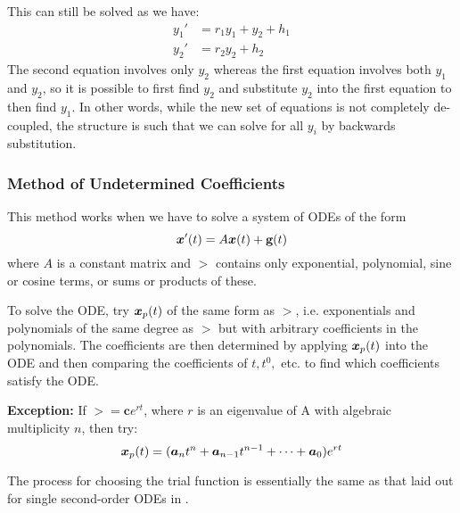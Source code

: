 This can still be solved as we have:
\begin{align*}
	y_1' &= r_1y_1 + y_2 + h_1 \\
	y_2' &= r_2y_2 + h_2
\end{align*}
The second equation involves only $y_2$ whereas the first equation involves both $y_1$ and $y_2$, so it is possible to first find $y_2$ and substitute $y_2$ into the first equation to then find $y_1$. In other words, while the new set of equations is not completely de-coupled, the structure is such that we can solve for all $y_i$ by backwards substitution.

\subsubsection{Method of Undetermined Coefficients}

This method works when we have to solve a system of ODEs of the form
\[
\bm{x}'(t) = A\bm{x}(t) + \textbf{g}(t)
\] 
where $A$ is a constant matrix and $\gt$ contains only exponential, polynomial, sine or cosine terms, or sums or products of these.

To solve the ODE, try $\bm{x}_p(t)$ of the same form as $\gt$, i.e. exponentials and polynomials of the same degree as $\gt$ but with arbitrary coefficients in the polynomials. The coefficients are then determined by applying $\bm{x}_p(t)$ into the ODE and then comparing the coefficients of $t, t^0, $ etc. to find which coefficients satisfy the ODE.

\textbf{Exception:} If $\gt = \bm{c} e^{rt}$, where $r$ is an eigenvalue of A with algebraic multiplicity $n$, then try:
\[
	\bm{x}_p(t) = (\bm{a}_n t^n+\bm{a}_{n-1} t^{n-1} + \cdots + \bm{a}_0)e^{rt}
\]

The process for choosing the trial function is essentially the same as that laid out for single second-order ODEs in .


